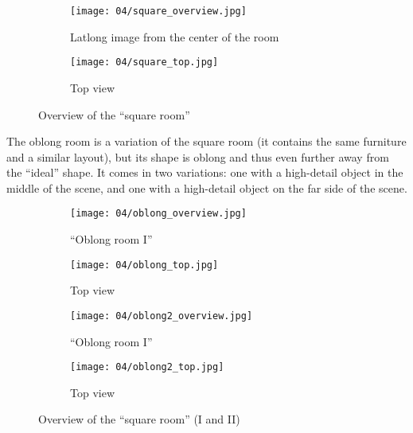 \begin{figure}
\centering
    \hfill
    \begin{subfigure}[b]{0.7\textwidth}
            \centering
            \texttt{[image: 04/square\_overview.jpg]}
            \caption{Latlong image from the center of the room}
    \end{subfigure}%
    \hfill
    \begin{subfigure}[b]{0.3\textwidth}
            \centering
            \texttt{[image: 04/square\_top.jpg]}
            \caption{Top view}
    \end{subfigure}
    \hfill
  \caption{Overview of the ``square room''}
\end{figure}


The oblong room is a variation of the square room (it contains the same furniture and a similar layout), but its shape is oblong and thus even further away from the ``ideal'' shape. It comes in two variations: one with a high-detail object in the middle of the scene, and one with a high-detail object on the far side of the scene.

\begin{figure}
\centering
    \hfill
    \begin{subfigure}[b]{0.5\textwidth}
            \centering
            \texttt{[image: 04/oblong\_overview.jpg]}
            \caption{``Oblong room I''}
    \end{subfigure}%
    \hfill
    \begin{subfigure}[b]{0.5\textwidth}
            \centering
            \texttt{[image: 04/oblong\_top.jpg]}
            \caption{Top view}
    \end{subfigure}
    \hfill

    \hfill
    \begin{subfigure}[b]{0.5\textwidth}
            \centering
            \texttt{[image: 04/oblong2\_overview.jpg]}
            \caption{``Oblong room I''}
    \end{subfigure}%
    \hfill
    \begin{subfigure}[b]{0.5\textwidth}
            \centering
            \texttt{[image: 04/oblong2\_top.jpg]}
            \caption{Top view}
    \end{subfigure}
    \hfill
  \caption{Overview of the ``square room'' (I and II)}
\end{figure}

